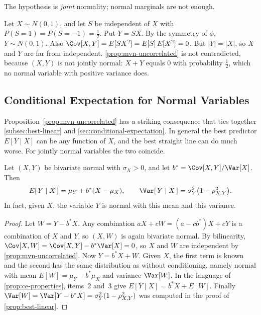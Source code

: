 The hypothesis is \emph{joint} normality; normal marginals are not enough.

\begin{eg}\label{eg:normal-not-joint}
	Let $X\sim N(0,1)$, and let $S$ be independent of $X$ with $P(S=1)=P(S=-1)=\tfrac12$.
	Put $Y=SX$.
	By the symmetry of $\phi$, $Y\sim N(0,1)$.
	Also $\Cov[X,Y]=E[SX^{2}]=E[S]\,E[X^{2}]=0$.
	But $|Y|=|X|$, so $X$ and $Y$ are far from independent.
	\autoref{prop:mvn-uncorrelated} is not contradicted, because $(X,Y)$ is not jointly normal:
	$X+Y$ equals $0$ with probability $\tfrac12$, which no normal variable with positive variance does.
\end{eg}

\subsection{Conditional Expectation for Normal Variables}

Proposition~\ref{prop:mvn-uncorrelated} has a striking consequence that ties together \autoref{subsec:best-linear} and \autoref{sec:conditional-expectation}.
In general the best predictor $E[Y\mid X]$ can be any function of $X$, and the best straight line can do much worse.
For jointly normal variables the two coincide.

\begin{proposition}\label{prop:normal-conditional}
	Let $(X,Y)$ be bivariate normal with $\sigma_{X}>0$, and let $b^{*}=\Cov[X,Y]/\Var[X]$.
	Then
	\[
		E[\,Y\mid X\,]=\mu_{Y}+b^{*}(X-\mu_{X}) ,
		\qquad
		\Var[\,Y\mid X\,]=\sigma_{Y}^{2}\bigl(1-\rho_{X,Y}^{2}\bigr) .
	\]
	In fact, given $X$, the variable $Y$ is normal with this mean and this variance.
\end{proposition}

\begin{proof}
	Let $W=Y-b^{*}X$.
	Any combination $aX+cW=(a-cb^{*})X+cY$ is a combination of $X$ and $Y$, so $(X,W)$ is again bivariate normal.
	By bilinearity, $\Cov[X,W]=\Cov[X,Y]-b^{*}\Var[X]=0$, so $X$ and $W$ are independent by \autoref{prop:mvn-uncorrelated}.
	Now $Y=b^{*}X+W$.
	Given $X$, the first term is known and the second has the same distribution as without conditioning, namely normal with mean $E[W]=\mu_{Y}-b^{*}\mu_{X}$ and variance $\Var[W]$.
	In the language of \autoref{prop:ce-properties}, items~2 and~3 give $E[Y\mid X]=b^{*}X+E[W]$.
	Finally $\Var[W]=\Var[Y-b^{*}X]=\sigma_{Y}^{2}(1-\rho_{X,Y}^{2})$ was computed in the proof of \autoref{prop:best-linear}.
\end{proof}

